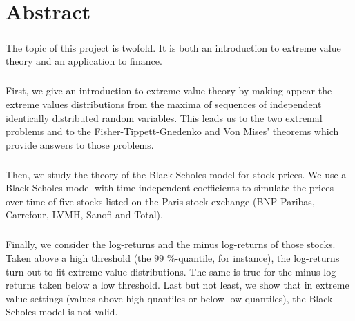 

\cleardoublepage
\chapter*{Abstract}
\bigskip
\paragraph{}
The topic of this project is twofold. It is both an introduction to extreme value theory and an application to finance.
\paragraph{}
First, we give an introduction to extreme value theory by making appear the extreme values distributions from the maxima of sequences of independent identically distributed random variables. This leads us to the two extremal problems and to the Fisher-Tippett-Gnedenko and Von Mises' theorems which provide answers to those problems.
\paragraph{}
Then, we study the theory of the Black-Scholes model for stock prices. We use a Black-Scholes model with time independent coefficients to simulate the prices over time of five stocks listed on the Paris stock exchange (BNP Paribas, Carrefour, LVMH, Sanofi and Total). 
\paragraph{}
Finally, we consider the log-returns and the minus log-returns of those stocks. Taken above a high threshold (the $99$ \%-quantile, for instance), the log-returns turn out to fit extreme value distributions. The same is true for the minus log-returns taken below a low threshold. Last but not least, we show that in extreme value settings (values above high quantiles or below low quantiles), the Black-Scholes model is not valid.
\vskip0.5cm


